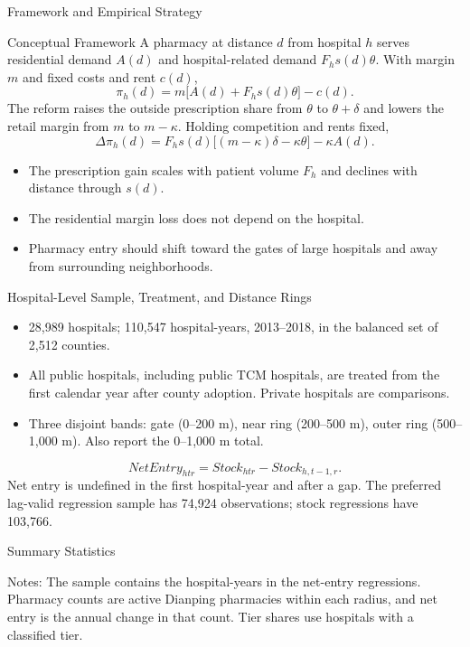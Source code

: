 \documentclass[aspectratio=169,11pt]{beamer}
\renewcommand{\arraystretch}{1.16}
\newcommand{\sectiondivider}[1]{%
  \begin{frame}
    \vfill
    \centering
    {\usebeamercolor[fg]{structure}\LARGE #1}
    \vfill
  \end{frame}%
}
\begin{document}
\sectiondivider{Framework and Empirical Strategy}

\begin{frame}{Conceptual Framework}
\small
A pharmacy at distance $d$ from hospital $h$ serves residential demand $A(d)$ and
hospital-related demand $F_hs(d)\theta$. With margin $m$ and fixed costs and rent $c(d)$,
\[
\pi_h(d)=m\bigl[A(d)+F_hs(d)\theta\bigr]-c(d). \tag{1}
\]
The reform raises the outside prescription share from $\theta$ to $\theta+\delta$ and
lowers the retail margin from $m$ to $m-\kappa$. Holding competition and rents fixed,
\[
\Delta\pi_h(d)=F_hs(d)\bigl[(m-\kappa)\delta-\kappa\theta\bigr]-\kappa A(d). \tag{2}
\]
\begin{itemize}\setlength\itemsep{0.45em}
 \item The prescription gain scales with patient volume $F_h$ and declines with distance through $s(d)$.
 \item The residential margin loss does not depend on the hospital.
 \item Pharmacy entry should shift toward the gates of large hospitals and away from surrounding neighborhoods.
\end{itemize}
\end{frame}

\begin{frame}{Hospital-Level Sample, Treatment, and Distance Rings}
\small
\begin{itemize}\setlength\itemsep{0.5em}
 \item 28,989 hospitals; 110,547 hospital-years, 2013--2018, in the balanced set of 2,512 counties.
 \item All public hospitals, including public TCM hospitals, are treated from the first calendar year after county adoption. Private hospitals are comparisons.
 \item Three disjoint bands: gate (0--200 m), near ring (200--500 m), outer ring (500--1,000 m). Also report the 0--1,000 m total.
\end{itemize}
\[
 NetEntry_{htr}=Stock_{htr}-Stock_{h,t-1,r}. \tag{3}
\]
\footnotesize Net entry is undefined in the first hospital-year and after a gap.
The preferred lag-valid regression sample has 74,924 observations; stock regressions have 103,766.
\end{frame}

\begin{frame}{Summary Statistics}
\centering\scriptsize\setlength{\tabcolsep}{5.5pt}
{\renewcommand{\arraystretch}{1.02}}
\par\vspace{0.35em}
\raggedright\tiny
Notes: The sample contains the hospital-years in the net-entry regressions. Pharmacy counts are active Dianping pharmacies within each radius, and net entry is the annual change in that count. Tier shares use hospitals with a classified tier.
\end{frame}
\end{document}
